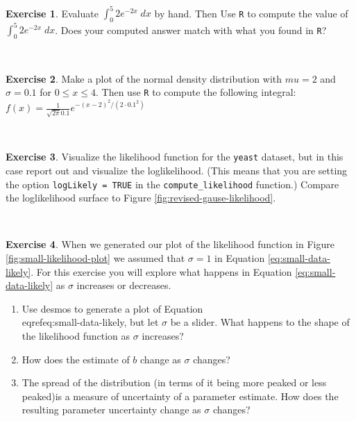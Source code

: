 \documentclass[
]{book}
\theoremstyle{definition}
\theoremstyle{definition}
\theoremstyle{definition}
\newtheorem{exercise}{Exercise}[chapter]
\theoremstyle{remark}
\begin{document}
~

\begin{exercise}
\protect\hypertarget{exr:unnamed-chunk-165}{}{\label{exr:unnamed-chunk-165} }Evaluate \(\displaystyle \int_{0}^{5} 2 e^{-2x} \; dx\) by hand. Then Use \texttt{R} to compute the value of \(\int_{0}^{5} 2 e^{-2x} \; dx\). Does your computed answer match with what you found in \texttt{R}?
\end{exercise}

~

\begin{exercise}
\protect\hypertarget{exr:unnamed-chunk-166}{}{\label{exr:unnamed-chunk-166} }Make a plot of the normal density distribution with \(mu=2\) and \(\sigma=0.1\) for \(0 \leq x \leq 4\). Then use \texttt{R} to compute the following integral: \(\displaystyle f(x)=\frac{1}{\sqrt{2 \pi} 0.1} e^{-(x-2)^{2}/(2\cdot 0.1^{2})}\)
\end{exercise}

~

\begin{exercise}
\protect\hypertarget{exr:unnamed-chunk-167}{}{\label{exr:unnamed-chunk-167} }Visualize the likelihood function for the \texttt{yeast} dataset, but in this case report out and visualize the loglikelihood. (This means that you are setting the option \texttt{logLikely\ =\ TRUE} in the \texttt{compute\_likelihood} function.) Compare the loglikelihood surface to Figure \ref{fig:revised-gause-likelihood}.
\end{exercise}

~

\begin{exercise}
\protect\hypertarget{exr:unnamed-chunk-168}{}{\label{exr:unnamed-chunk-168} }When we generated our plot of the likelihood function in Figure \ref{fig:small-likelihood-plot} we assumed that \(\sigma=1\) in Equation \eqref{eq:small-data-likely}. For this exercise you will explore what happens in Equation \eqref{eq:small-data-likely} as \(\sigma\) increases or decreases.

\begin{enumerate}[label=\alph*.]
\item Use desmos to generate a plot of Equation \\eqref{eq:small-data-likely}, but let $\sigma$ be a slider.  What happens to the shape of the likelihood function as $\sigma$ increases?
\item How does the estimate of $b$ change as $\sigma$ changes?
\item The spread of the distribution (in terms of it being more peaked or less peaked)is a measure of uncertainty of a parameter estimate. How does the resulting parameter uncertainty change as $\sigma$ changes?
\end{enumerate}
\end{exercise}
\end{document}
